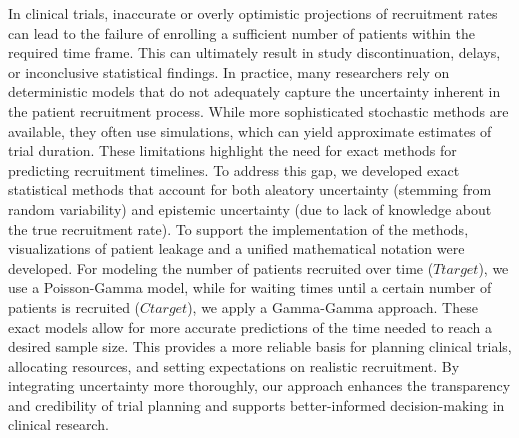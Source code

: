 \documentclass[11pt,a4paper,twoside]{book}
\begin{document}
\noindent
In clinical trials, inaccurate or overly optimistic projections of recruitment rates can lead to the failure of enrolling a sufficient number of patients within the required time frame. This can ultimately result in study discontinuation, delays, or inconclusive statistical findings. In practice, many researchers rely on deterministic models that do not adequately capture the uncertainty inherent in the patient recruitment process. While more sophisticated stochastic methods are available, they often use simulations, which can yield approximate estimates of trial duration. These limitations highlight the need for exact methods for predicting recruitment timelines. To address this gap, we developed exact statistical methods that account for both aleatory uncertainty (stemming from random variability) and epistemic uncertainty (due to lack of knowledge about the true recruitment rate). To support the implementation of the methods, visualizations of patient leakage and a unified mathematical notation were developed. For modeling the number of patients recruited over time  ($Ttarget$), we use a Poisson-Gamma model, while for waiting times until a certain number of patients is recruited ($Ctarget$), we apply a Gamma-Gamma approach. These exact models allow for more accurate predictions of the time needed to reach a desired sample size. This provides a more reliable basis for planning clinical trials, allocating resources, and setting expectations on realistic recruitment. By integrating uncertainty more thoroughly, our approach enhances the transparency and credibility of trial planning and supports better-informed decision-making in clinical research.

\vspace{2em}  %











\end{document}
